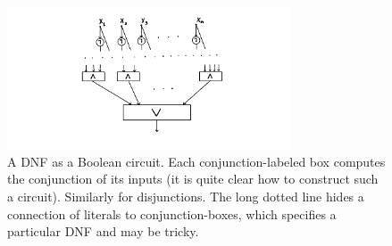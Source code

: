 \documentclass[12pt,notitlepage]{article}
\theoremstyle{plain}
\theoremstyle{definition}
\theoremstyle{plain}
\newcommand{\1}{\mathbf{1}}
\newcommand{\0}{\mathbf{0}}
\begin{document}
\begin{figure}[h]
\centering
\includegraphics*[width=0.75\textwidth]{circuits_dnf.pdf}
\caption{A DNF as a Boolean circuit. Each conjunction-labeled box computes the conjunction of its inputs (it is quite clear how to construct such a circuit). Similarly for disjunctions. The long dotted line hides a connection of literals to conjunction-boxes, which specifies a particular DNF and may be tricky.}
\end{figure}
\end{document}
